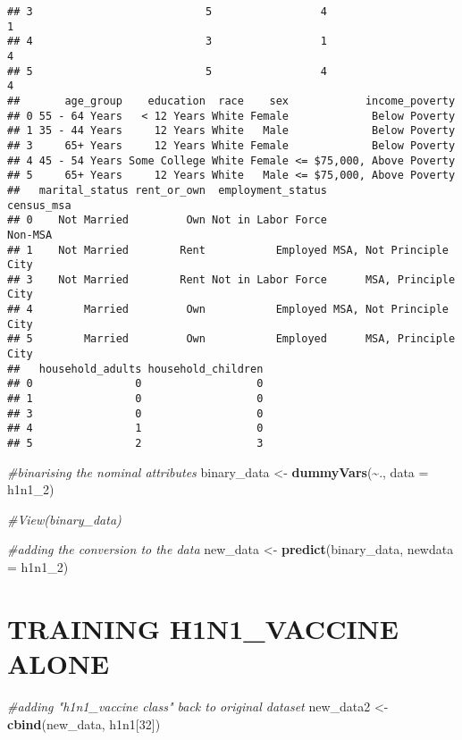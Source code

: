 \documentclass[
]{article}
\newenvironment{Shaded}{\begin{snugshade}}{\end{snugshade}}
\newcommand{\AttributeTok}[1]{\textcolor[rgb]{0.13,0.29,0.53}{#1}}
\newcommand{\CommentTok}[1]{\textcolor[rgb]{0.56,0.35,0.01}{\textit{#1}}}
\newcommand{\DecValTok}[1]{\textcolor[rgb]{0.00,0.00,0.81}{#1}}
\newcommand{\FunctionTok}[1]{\textcolor[rgb]{0.13,0.29,0.53}{\textbf{#1}}}
\newcommand{\NormalTok}[1]{#1}
\newcommand{\OtherTok}[1]{\textcolor[rgb]{0.56,0.35,0.01}{#1}}
\newcommand{\SpecialCharTok}[1]{\textcolor[rgb]{0.81,0.36,0.00}{\textbf{#1}}}
\begin{document}
\begin{verbatim}
## 3                           5                 4                           1
## 4                           3                 1                           4
## 5                           5                 4                           4
##       age_group    education  race    sex            income_poverty
## 0 55 - 64 Years   < 12 Years White Female             Below Poverty
## 1 35 - 44 Years     12 Years White   Male             Below Poverty
## 3     65+ Years     12 Years White Female             Below Poverty
## 4 45 - 54 Years Some College White Female <= $75,000, Above Poverty
## 5     65+ Years     12 Years White   Male <= $75,000, Above Poverty
##   marital_status rent_or_own  employment_status               census_msa
## 0    Not Married         Own Not in Labor Force                  Non-MSA
## 1    Not Married        Rent           Employed MSA, Not Principle  City
## 3    Not Married        Rent Not in Labor Force      MSA, Principle City
## 4        Married         Own           Employed MSA, Not Principle  City
## 5        Married         Own           Employed      MSA, Principle City
##   household_adults household_children
## 0                0                  0
## 1                0                  0
## 3                0                  0
## 4                1                  0
## 5                2                  3
\end{verbatim}

\begin{Shaded}
\begin{Highlighting}[]
\CommentTok{\#binarising the nominal attributes}
\NormalTok{binary\_data }\OtherTok{\textless{}{-}} \FunctionTok{dummyVars}\NormalTok{(}\SpecialCharTok{\textasciitilde{}}\NormalTok{., }\AttributeTok{data =}\NormalTok{ h1n1\_2)}

\CommentTok{\#View(binary\_data)}

\CommentTok{\#adding the conversion to the data}
\NormalTok{new\_data }\OtherTok{\textless{}{-}} \FunctionTok{predict}\NormalTok{(binary\_data, }\AttributeTok{newdata =}\NormalTok{ h1n1\_2)}
\end{Highlighting}
\end{Shaded}

\section{TRAINING H1N1\_VACCINE
ALONE}\label{training-h1n1_vaccine-alone}

\begin{Shaded}
\begin{Highlighting}[]
\CommentTok{\#adding "h1n1\_vaccine class" back to original dataset}
\NormalTok{new\_data2 }\OtherTok{\textless{}{-}} \FunctionTok{cbind}\NormalTok{(new\_data, h1n1[}\DecValTok{32}\NormalTok{])}
\end{Highlighting}
\end{Shaded}
\end{document}
